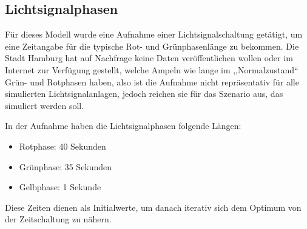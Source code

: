 %


\subsection{Lichtsignalphasen}\label{subsec:phases}

Für dieses Modell wurde eine Aufnahme einer Lichtsignalschaltung getätigt, um eine Zeitangabe für die typische Rot- und Grünphasenlänge zu bekommen.
Die Stadt Hamburg hat auf Nachfrage keine Daten veröffentlichen wollen oder im Internet zur Verfügung gestellt, welche Ampeln wie lange im ,,Normalzustand`` Grün- und Rotphasen haben, also ist die Aufnahme nicht repräsentativ für alle simulierten Lichtsignalanlagen, jedoch reichen sie für das Szenario aus, das simuliert werden soll.

In der Aufnahme haben die Lichtsignalphasen folgende Längen:
\begin{itemize}
    \item Rotphase: 40 Sekunden
    \item Grünphase: 35 Sekunden
    \item Gelbphase: 1 Sekunde
\end{itemize}

Diese Zeiten dienen als Initialwerte, um danach iterativ sich dem Optimum von der Zeitschaltung zu nähern.
